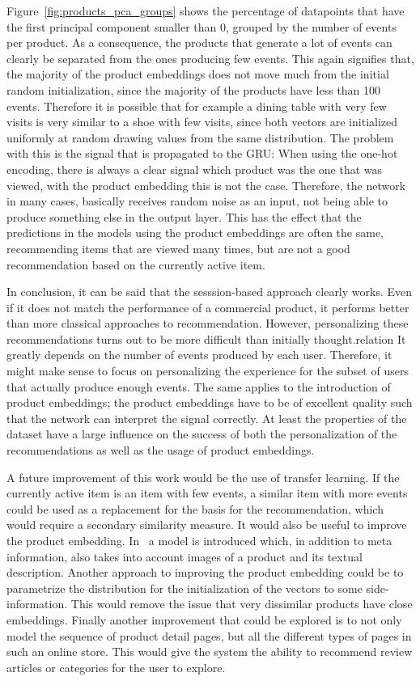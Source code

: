 Figure~\ref{fig:products_pca_groups} shows the percentage of datapoints that have the first principal component smaller than 0, grouped by the number of events per product.
As a consequence, the products that generate a lot of events can clearly be separated from the ones producing few events.
This again signifies that, the majority of the product embeddings does not move much from the initial random initialization, since the majority of the products have less than 100 events.
Therefore it is possible that for example a dining table with very few visits is very similar to a shoe with few visits, since both vectors are initialized uniformly at random drawing values from the same distribution.
The problem with this is the signal that is propagated to the GRU:
When using the one-hot encoding, there is always a clear signal which product was the one that was viewed, with the product embedding this is not the case.
Therefore, the network in many cases, basically receives random noise as an input, not being able to produce something else in the output layer.
This has the effect that the predictions in the models using the product embeddings are often the same, recommending items that are viewed many times, but are not a good recommendation based on the currently active item.
\par
In conclusion, it can be said that the sesssion-based approach clearly works.
Even if it does not match the performance of a commercial product, it performs better than more classical approaches to recommendation.
However, personalizing these recommendations turns out to be more difficult than initially thought.relation
It greatly depends on the number of events produced by each user.
Therefore, it might make sense to focus on personalizing the experience for the subset of users that actually produce enough events.
The same applies to the introduction of product embeddings; the product embeddings have to be of excellent quality such that the network can interpret the signal correctly.
At least the properties of the dataset have a large influence on the success of both the personalization of the recommendations as well as the usage of product embeddings.
\par
A future improvement of this work would be the use of transfer learning.
If the currently active item is an item with few events, a similar item with more events could be used as a replacement for the basis for the recommendation, which would require a secondary similarity measure.
It would also be useful to improve the product embedding.
In~\cite{content2vec} a model is introduced which, in addition to meta information, also takes into account images of a product and its textual description.
Another approach to improving the product embedding could be to parametrize the distribution for the initialization of the vectors to some side-information.
This would remove the issue that very dissimilar products have close embeddings.
Finally another improvement that could be explored is to not only model the sequence of product detail pages, but all the different types of pages in such an online store.
This would give the system the ability to recommend review articles or categories for the user to explore.